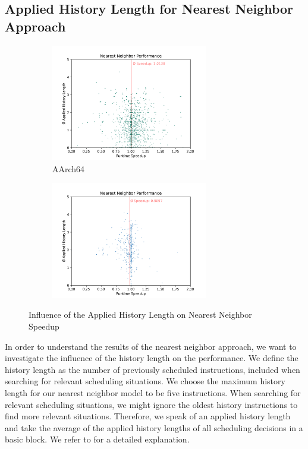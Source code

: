 \subsection{Applied History Length for Nearest Neighbor Approach}
\label{sec:eval:hist-length-vs-perf}
\begin{figure}
    \begin{subfigure}{\textwidth}
        \centering
        \includegraphics[width=0.75\textwidth]{img/nearest-neighbor/rpi_nn_scatter_no_outliers.pdf}
        \caption{AArch64}
        \label{fig:eval:nn-hist:pi}
    \end{subfigure}
    \vfill
    \begin{subfigure}{\textwidth}
        \centering
        \includegraphics[width=0.75\textwidth]{img/nearest-neighbor/aurora_nn_scatter_no_outliers.pdf}
        \caption{\auroralong{}}
        \label{fig:eval:nn-hist:aurora}
    \end{subfigure}
    \caption{Influence of the Applied History Length on Nearest Neighbor Speedup}
    \label{fig:eval:nn-hist}
\end{figure}
In order to understand the results of the nearest neighbor approach, we want to investigate the influence of the history length on the performance.
We define the history length as the number of previously scheduled instructions, included when searching for relevant scheduling situations.
We choose the maximum history length for our nearest neighbor model to be five instructions.
When searching for relevant scheduling situations, we might ignore the oldest history instructions to find more relevant situations.
Therefore, we speak of an applied history length and take the average of the applied history lengths of all scheduling decisions in a basic block.
We refer to  for a detailed explanation.

